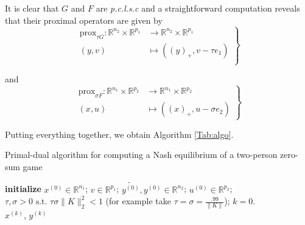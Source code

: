 \documentclass[a4paper,9pt,journal]{IEEEtran}
\begin{document}
It is clear that $G$ and $F$ are \textit{p.c.l.s.c} and a straightforward computation reveals that their proximal operators are given by
\begin{equation}
  \left .
  \begin{split}
    \text{prox}_{\tau G} : \mathbb{R}^{n_2} \times \mathbb{R}^{p_1} &\rightarrow \mathbb{R}^{n_2} \times \mathbb{R}^{p_1}\\
    (y, v) &\mapsto ((y)_+, v - \tau e_1)\\
  \end{split}
  \right\}
\end{equation}

and
\begin{equation}
  \left .
  \begin{split}
    \text{prox}_{\sigma F}: \mathbb{R}^{n_1} \times \mathbb{R}^{p_2} &\rightarrow \mathbb{R}^{n_1} \times \mathbb{R}^{p_2}\\
    (x, u) &\mapsto ((x)_+, u - \sigma e_2)
  \end{split}
  \right\}
\end{equation}

Putting everything together, we obtain Algorithm \ref{Tab:algo}.

\begin{algorithm}[htb]
  \caption{Primal-dual algorithm for computing a Nash equilibrium of a two-person zero-sum game}
  \textbf{initialize}
  $x^{(0)} \in \mathbb{R}^{n_1}$; $v \in \mathbb{R}^{p_1}$; $\tilde{y^{(0)}}, y^{(0)} \in \mathbb{R}^{n_2}$; $u^{(0)} \in \mathbb{R}^{p_2}$; 
  $\tau, \sigma > 0 \text{ s.t. }\tau\sigma \|K\|_2^2 < 1$ (for example take $\tau = \sigma = \frac{.99}{\|K\|}$); $k = 0$.\\
   \Return $x^{(k)}$, $y^{(k)}$
  \label{Tab:algo}
\end{algorithm}
\end{document}
